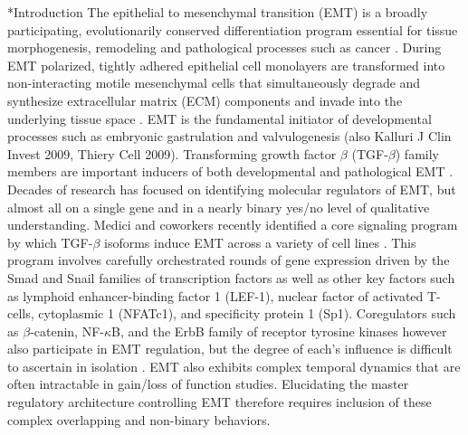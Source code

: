 \documentclass[12pt]{article}
\makeatletter
\renewcommand\section{\@startsection
	{subsection}{2}{0mm}
	{-0.2in}
	{0.05\baselineskip}
	{\normalfont\large\bfseries}}
\makeatother
\begin{document}
\linenumbers

\section*{Introduction}
The epithelial to mesenchymal transition (EMT) is a broadly participating, evolutionarily conserved differentiation program essential for tissue morphogenesis, remodeling and pathological processes such as cancer \citep{Thiery:2003il}. During EMT polarized, tightly adhered epithelial cell monolayers are transformed into non-interacting motile mesenchymal cells that simultaneously degrade and synthesize extracellular matrix (ECM) components and invade into the underlying tissue space \citep{Stahl:2001pd}. EMT is the fundamental initiator of developmental processes such as embryonic gastrulation and valvulogenesis \citep{Eisenberg:1995ai} (also Kalluri J Clin Invest 2009, Thiery Cell 2009). Transforming growth factor $\beta$ (TGF-$\beta$) family members are important inducers of both developmental and pathological EMT \citep{Zavadil:2005fu,Xu:2009oq}. Decades of research has focused on identifying molecular regulators of EMT, but almost all on a single gene and in a nearly binary yes/no level of qualitative understanding. Medici and coworkers recently identified a core signaling program by which TGF-$\beta$ isoforms induce EMT across a variety of cell lines \citep{Medici:2006qa,Medici:2008fk}.
This program involves carefully orchestrated rounds of gene expression driven by the Smad and Snail families of transcription factors as well as
other key factors such as lymphoid enhancer-binding factor 1 (LEF-1), nuclear factor of activated T-cells, cytoplasmic 1 (NFATc1), and specificity protein 1 (Sp1).
Coregulators such as $\beta$-catenin, NF-$\kappa$B, and the ErbB family of receptor tyrosine kinases however also participate in EMT regulation, but the degree of each's influence is difficult to ascertain in isolation \citep{Kim:2002lh,Jiang:2007aa,Huber:2004aa,Hardy:2010aa}.
EMT also exhibits complex temporal dynamics that are often intractable in gain/loss of function studies.
Elucidating the master regulatory architecture controlling EMT therefore requires inclusion of these complex overlapping and non-binary behaviors.
\end{document}
